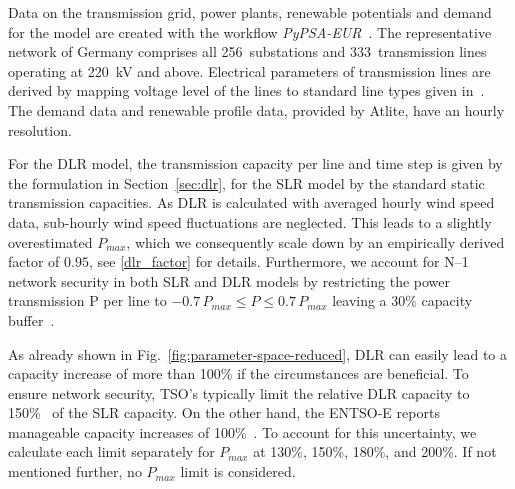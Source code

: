 \documentclass[preprint,12pt]{elsarticle}
\begin{document}
Data on the transmission grid, power plants, renewable potentials and demand for the model are created with the workflow \textit{PyPSA-EUR}~\cite{horschPyPSAEurOpenOptimisation2018,horschjonasPyPSAEurOpenOptimisation2022}.
The representative network of Germany comprises all 256~substations and 333~transmission lines operating at 220~kV and above. Electrical parameters of transmission lines are derived by mapping voltage level of the lines to standard line types given in~\cite{oedingElektrischeKraftwerkeUnd2011}.
The demand data and renewable profile data, provided by Atlite, have an hourly resolution.

For the DLR model, the transmission capacity per line and time step is given by the formulation in Section~\ref{sec:dlr}, for the SLR model by the standard static transmission capacities. As DLR is calculated with averaged hourly wind speed data, sub-hourly wind speed fluctuations are neglected. This leads to a slightly overestimated $P_{max}$, which we consequently scale down by an empirically derived factor of $0.95$, see \ref{dlr_factor} for details. Furthermore, we account for N--1 network security in both SLR and DLR models by restricting the power transmission P per line to $-0.7\,P_{max} \le P \le 0.7\,P_{max}$ leaving a 30\% capacity buffer~\cite{brownOptimisingEuropeanTransmission2016}.

As already shown in Fig.~\ref{fig:parameter-space-reduced}, DLR can easily lead to a capacity increase of more than 100\% if the circumstances are beneficial. To ensure network security, TSO's typically limit the relative DLR capacity to 150\%~\cite{transnetbwFreileitungsmonitoring} of the SLR capacity. On the other hand, the ENTSO-E reports manageable capacity increases of 100\%~\cite{entso-eDynamicLineRating}. To account for this uncertainty, we calculate each limit separately for $P_{max}$ at 130\%, 150\%, 180\%, and 200\%. If not mentioned further, no $P_{max}$ limit is considered.

\end{document}
